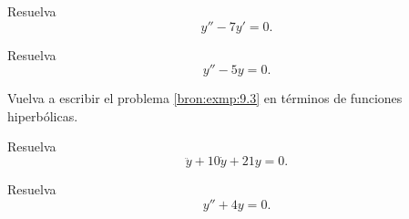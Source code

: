 \begin{problema}
	\label{bron:exmp:9.2}
	Resuelva $$y''-7y'=0.$$
\end{problema}





\begin{problema}
	\label{bron:exmp:9.3}
	Resuelva
	$$y''-5y=0.$$
\end{problema}




\begin{problema}
	\label{bron:exmp:9.4}
	Vuelva a escribir el problema \ref{bron:exmp:9.3} en t\'erminos de funciones hiperb\'olicas.
\end{problema}




\begin{problema}
	\label{bron:exmp:9.5}
	Resuelva
	$$
	\ddot{y}+10\dot{y}+21y=0.
	$$
\end{problema}




\begin{problema}
	\label{bron:exmp:9.8}
	Resuelva
	$$
	y''+4y=0.
	$$
\end{problema}


